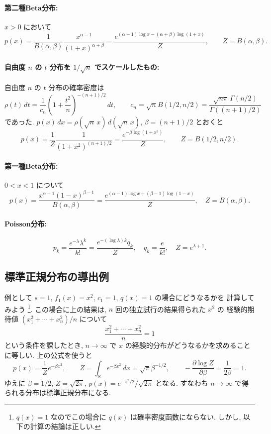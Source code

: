 \documentclass[12pt,twoside]{jarticle}
\newcommand\R{{\mathbb R}} %
\renewcommand\d{\partial}
\theoremstyle{jplain}
\theoremstyle{jplain}
\theoremstyle{jplain}
\numberwithin{theorem}{section}
\numberwithin{equation}{section}
\numberwithin{figure}{section}
\numberwithin{table}{section}
\begin{document}
\paragraph{第二種Beta分布:} $x>0$ において
\[
p(x)
=\frac{1}{B(\alpha,\beta)}\frac{x^{\alpha-1}}{(1+x)^{\alpha+\beta}}
=\frac{e^{(\alpha-1)\log x-(\alpha+\beta)\log(1+x)}}{Z},
\qquad
Z=B(\alpha,\beta).
\]

\paragraph{自由度 $n$ の $t$ 分布を $1/\sqrt{n}$ でスケールしたもの:}
自由度 $n$ の $t$ 分布の確率密度は
\[
\rho(t)\,dt
=
\frac{1}{c_n} \left(1+\frac{t^2}{n}\right)^{-(n+1)/2}\,dt,
\qquad
c_n=\sqrt{n}B(1/2,n/2)
=\frac{\sqrt{n\pi}\,\Gamma(n/2)}{\Gamma((n+1)/2)}
\]
であった. 
$p(x)\,dx=\rho(\sqrt{n}\,x)\,d(\sqrt{n}\,x)$, $\beta=(n+1)/2$ とおくと
\[
p(x)
=\frac{1}{Z}\frac{1}{(1+x^2)^{(n+1)/2}}
=\frac{e^{-\beta\log(1+x^2)}}{Z}, 
\qquad
Z=B(1/2,n/2).
\]

\paragraph{第一種Beta分布:} $0<x<1$ について
\[
p(x)
=\frac{x^{\alpha-1}(1-x)^{\beta-1}}{B(\alpha,\beta)}
=\frac{e^{(\alpha-1)\log x+(\beta-1)\log(1-x)}}{Z},
\quad
Z=B(\alpha,\beta).
\]

\paragraph{Poisson分布:}
\[
p_k 
= \frac{e^{-\lambda}\lambda^k}{k!}
=\frac{e^{-(\log\lambda)k}q_k}{Z},
\quad  
q_k=\frac{e}{k!},
\quad
Z=e^{\lambda+1}.
\]


\subsection{標準正規分布の導出例}
\label{sec:normal-Gibbs}

例として $s=1$, $f_1(x)=x^2$, $c_1=1$, $q(x)=1$ の場合にどうなるかを
計算してみよう%
\footnote{$q(x)=1$ なのでこの場合に $q(x)$ は確率密度函数にならない.
しかし, 以下の計算の結論は正しい.}.
この場合に上の結果は, $n$ 回の独立試行の結果得られた $x^2$ の
経験的期待値 $(x_1^2+\cdots+x_n^2)/n$ について
\[
\frac{x_1^2+\cdots+x_n^2}{n}=1
\]
という条件を課したとき, 
$n\to\infty$ で $x$ の経験的分布がどうなるかを求めることに等しい.
上の公式を使うと
\[
p(x)=\frac{1}{Z}e^{-\beta x^2}, \qquad
Z=\int_\R e^{-\beta x^2}\,dx=\sqrt{\pi}\beta^{-1/2}, \qquad
-\frac{\d\log Z}{\d\beta}=\frac{1}{2\beta}=1.
\]
ゆえに $\beta=1/2$, $Z=\sqrt{2\pi}$, $p(x)=e^{-x^2/2}/\sqrt{2\pi}$ となる.
すなわち $n\to\infty$ で得られる分布は標準正規分布になる.
\end{document}
